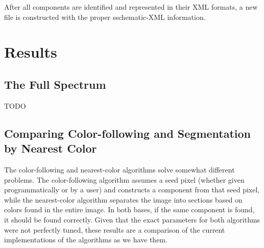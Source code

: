 \documentclass[10pt,twocolumn,letterpaper]{article}
\begin{document}
After all components are identified and represented in their XML formats, a new
file is constructed with the proper sschematic-XML information.    

\section{Results}

\subsection{The Full Spectrum}

TODO

\subsection{Comparing Color-following and Segmentation by Nearest Color}

The color-following and nearest-color algorithms solve somewhat different
problems. The color-following algorithm assumes a seed pixel (whether given
programmatically or by a user) and constructs a component from that seed pixel,
while the nearest-color algorithm separates the image into sections based on
colors found in the entire image. In both bases, if the same component is
found, it should be found correctly. Given that the exact parameters for both
algorithms were not perfectly tuned, these results are a comparison of the
current implementations of the algorithms as we have them.
\end{document}
